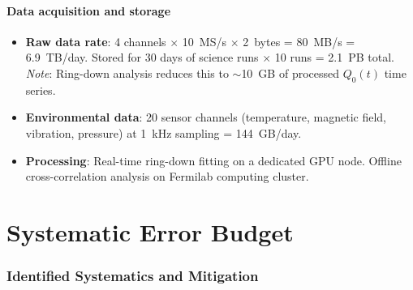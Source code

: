 \documentclass[11pt]{article}
\begin{document}
\subsection{Data acquisition and storage}

\begin{itemize}[nosep]
\item \textbf{Raw data rate}: 4 channels $\times$ 10~MS/s $\times$
  2~bytes = 80~MB/s = 6.9~TB/day. Stored for 30 days of science runs
  $\times$ 10 runs = 2.1~PB total. \textit{Note}: Ring-down analysis
  reduces this to $\sim$10~GB of processed $Q_0(t)$ time series.
\item \textbf{Environmental data}: 20 sensor channels (temperature,
  magnetic field, vibration, pressure) at 1~kHz sampling = 144~GB/day.
\item \textbf{Processing}: Real-time ring-down fitting on a
  dedicated GPU node. Offline cross-correlation analysis on Fermilab
  computing cluster.
\end{itemize}


\part{Systematic Error Budget}

\section{Identified Systematics and Mitigation}
\label{sec:systematics}
\end{document}
